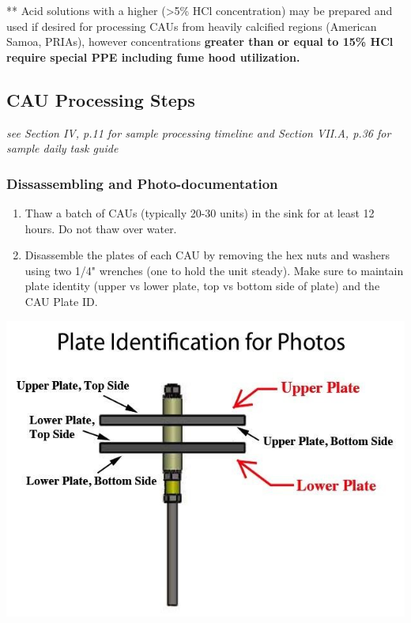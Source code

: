 \documentclass[]{book}
\begin{document}
** Acid solutions with a higher (\textgreater5\% HCl concentration) may be prepared and used if desired for processing CAUs from heavily calcified regions (American Samoa, PRIAs), however concentrations \textbf{greater than or equal to 15\% HCl require special PPE including fume hood utilization.}

\hypertarget{cau-processing-steps}{%
\subsection{CAU Processing Steps}\label{cau-processing-steps}}

\emph{see Section IV, p.11 for sample processing timeline and Section VII.A, p.36 for sample daily task guide}

\hypertarget{dissassembling-and-photo-documentation}{%
\subsubsection{Dissassembling and Photo-documentation}\label{dissassembling-and-photo-documentation}}

\begin{enumerate}
\def\labelenumi{\arabic{enumi}.}
\item
  Thaw a batch of CAUs (typically 20-30 units) in the sink for at least 12 hours. Do not thaw over water.
\item
  Disassemble the plates of each CAU by removing the hex nuts and washers using two 1/4" wrenches (one to hold the unit steady). Make sure to maintain plate identity (upper vs lower plate, top vs bottom side of plate) and the CAU Plate ID.
\end{enumerate}

\includegraphics{images/CAU_plate_ID.jpg}
\end{document}
